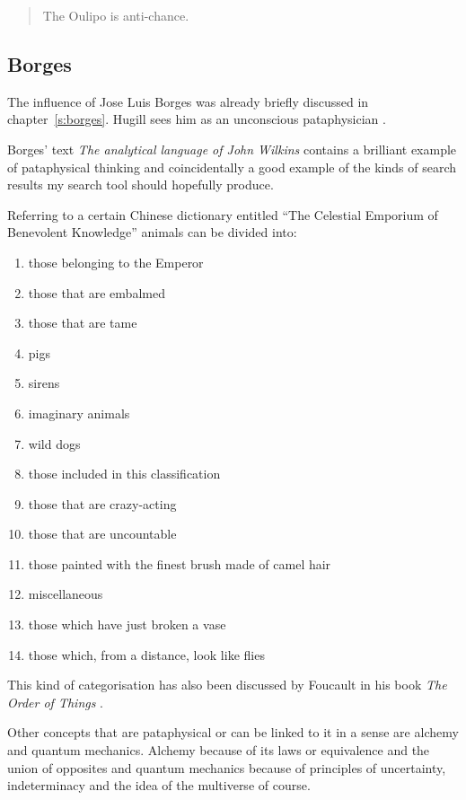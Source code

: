 \begin{quotation}
  The Oulipo is anti-chance. 
\end{quotation}


\subsection{Borges}

The influence of Jose Luis Borges was already briefly discussed in chapter~\ref{s:borges}. Hugill sees him as an unconscious pataphysician \citeyear{Hugill2012}.

Borges' text \textit{The analytical language of John Wilkins} \citeyear{Borges2000} contains a brilliant example of pataphysical thinking and coincidentally a good example of the kinds of search results my search tool should hopefully produce.

Referring to a certain Chinese dictionary entitled ``The Celestial Emporium of Benevolent Knowledge'' animals can be divided into:

\begin{enumerate}
  \item	those belonging to the Emperor
  \item	those that are embalmed
  \item	those that are tame
  \item	pigs
  \item	sirens
  \item	imaginary animals
  \item	wild dogs
  \item	those included in this classification
  \item	those that are crazy-acting
  \item	those that are uncountable
  \item	those painted with the finest brush made of camel hair
  \item	miscellaneous
  \item	those which have just broken a vase
  \item	those which, from a distance, look like flies
\end{enumerate}

This kind of categorisation has also been discussed by Foucault in his book \textit{The Order of Things} \citeyear{Foucault1966}.

\spirals

Other concepts that are pataphysical or can be linked to it in a sense are alchemy and quantum mechanics. Alchemy because of its laws or equivalence and the union of opposites \autocite{Hugill2012} and quantum mechanics because of principles of uncertainty, indeterminacy and the idea of the multiverse of course.

